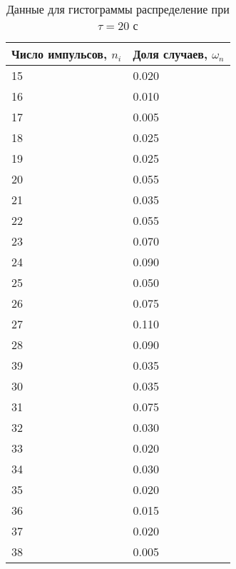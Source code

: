 \documentclass[a4paper]{article}
\begin{document}
\begin{table}[!h]
\begin{center}
\begin{tabular}{|l|l|}
\hline
Число импульсов, $n_{i}$ & Доля случаев, $\omega_{n}$ \\ \hline
15                       & 0.020                      \\ \hline
16                       & 0.010                      \\ \hline
17                       & 0.005                       \\ \hline
18                       & 0.025                      \\ \hline
19                       & 0.025                       \\ \hline
20                       & 0.055                       \\ \hline
21                       & 0.035                       \\ \hline
22                       & 0.055                       \\ \hline
23                       & 0.070                      \\ \hline
24                       & 0.090                       \\ \hline
25                       & 0.050                      \\ \hline
26                       & 0.075                       \\ \hline
27                       & 0.110                       \\ \hline
28                       & 0.090                       \\ \hline
39                       & 0.035                       \\ \hline
30                       & 0.035                      \\ \hline
31                       & 0.075                       \\ \hline
32                       & 0.030                      \\ \hline
33                       & 0.020                      \\ \hline
34                       & 0.030                       \\ \hline
35                       & 0.020                       \\ \hline
36                       & 0.015                       \\ \hline
37                       & 0.020                      \\ \hline
38                       & 0.005                      \\ \hline
\end{tabular}
\caption{Данные для гистограммы распределение при $\tau = 20$ с}
\end{center}
\end{table}
\end{document}
